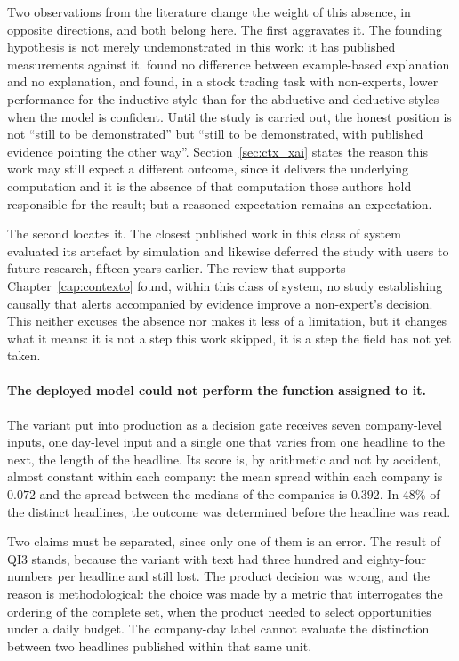 Two observations from the literature change the weight of this absence, in opposite directions,
and both belong here. The first aggravates it. The founding hypothesis is not merely undemonstrated
in this work: it has published measurements against it. \textcite{waa2021xai} found no difference
between example-based explanation and no explanation, and \textcite{cau2023logicstyle} found, in a
stock trading task with non-experts, lower performance for the inductive style than for the
abductive and deductive styles when the model is confident. Until the study is carried out, the
honest position is not ``still to be demonstrated'' but ``still to be demonstrated, with published
evidence pointing the other way''. Section~\ref{sec:ctx_xai} states the reason this work may still
expect a different outcome, since it delivers the underlying computation and it is the absence of
that computation those authors hold responsible for the result; but a reasoned expectation
remains an expectation.

The second locates it. The closest published work in this class of system
\autocite{muntermann2009ubiquitous} evaluated its artefact by simulation and likewise deferred the
study with users to future research, fifteen years earlier. The review that supports
Chapter~\ref{cap:contexto} found, within this class of system, no study establishing causally that
alerts accompanied by evidence improve a non-expert's decision. This neither excuses the absence
nor makes it less of a limitation, but it changes what it means: it is not a step this work
skipped, it is a step the field has not yet taken.

\paragraph{The deployed model could not perform the function assigned to it.}
The variant put into production as a decision gate receives seven company-level inputs, one
day-level input and a single one that varies from one headline to the next, the length of the
headline. Its score is, by arithmetic and not by accident, almost constant within each company: the
mean spread within each company is $0.072$ and the spread between the medians of the companies is
$0.392$. In $48\%$ of the distinct headlines, the outcome was determined before the headline was
read.

Two claims must be separated, since only one of them is an error. The result of \gls{QI}3 stands,
because the variant with text had three hundred and eighty-four numbers per headline and still
lost. The product decision was wrong, and the reason is methodological: the choice was made by a
metric that interrogates the ordering of the complete set, when the product needed to select
opportunities under a daily budget. The company-day label cannot evaluate the distinction between
two headlines published within that same unit.

